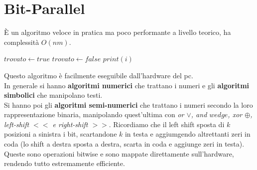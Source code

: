 \documentclass[a4paper,12pt, oneside]{book}
\begin{document}
\section{Bit-Parallel}
È un algoritmo veloce in pratica ma poco performante a livello
teorico, ha complessità $O(nm)$.
\begin{shaded}
  \begin{algorithmic}
    \State $trovato \gets true$
    \State $trovato \gets false$
    \EndIf
    \EndFor
    \State $print(i)$
    \EndIf
    \EndFor
  \end{algorithmic} 
\end{shaded}
Questo algoritmo è facilmente eseguibile dall'hardware del pc. \\
In generale si hanno \textbf{algoritmi numerici} che trattano i numeri
e gli \textbf{algoritmi simbolici} che manipolano testi.\\
Si hanno poi gli\textbf{ algoritmi semi-numerici} che trattano i
numeri secondo la loro rappresentazione binaria, manipolando quest'ultima
con \textit{or $\vee$, and $wedge$, xor $\oplus$, left-shift $<<$ e
  right-shift $>>$}. Ricordiamo che il left shift sposta di $k$
posizioni a sinistra i bit, scartandone $k$ in testa e aggiumgendo
altrettanti zeri in coda (lo shift a destra sposta a destra, scarta in
coda e aggiunge zeri in testa). Queste sono operazioni bitwise e sono
mappate direttamente sull'hardware, rendendo tutto estremamente
efficiente.\\
\end{document}

